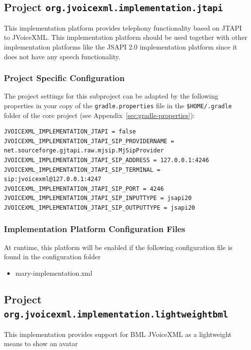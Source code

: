 \documentclass[11pt,a4paper]{article}
\begin{document}
\subsection{Project \texttt{org.jvoicexml.implementation.jtapi}}

This implementation platform provides telephony functionality based on JTAPI to
JVoiceXML. This implementation platform should be used together with other
implementation platforms like the JSAPI 2.0 implementation platform since it
does not have any speech functionality.

\subsubsection{Project Specific Configuration}

The project settings for this subproject can be adapted by the following
properties in your copy of the \texttt{gradle.properties} file in the
\texttt{\${HOME}/.gradle} folder of the core project (see 
Appendix~\ref{sec:gradle-properties}):
\begin{lstlisting}
JVOICEXML_IMPLEMENTATION_JTAPI = false
JVOICEXML_IMPLEMENTATION_JTAPI_SIP_PROVIDERNAME = net.sourceforge.gjtapi.raw.mjsip.MjSipProvider
JVOICEXML_IMPLEMENTATION_JTAPI_SIP_ADDRESS = 127.0.0.1:4246
JVOICEXML_IMPLEMENTATION_JTAPI_SIP_TERMINAL = sip:jvoicexml@127.0.0.1:4247
JVOICEXML_IMPLEMENTATION_JTAPI_SIP_PORT = 4246
JVOICEXML_IMPLEMENTATION_JTAPI_SIP_INPUTTYPE = jsapi20
JVOICEXML_IMPLEMENTATION_JTAPI_SIP_OUTPUTTYPE = jsapi20
\end{lstlisting}

\subsubsection{Implementation Platform Configuration Files}

At runtime, this platform will be enabled if the following configuration file is found in the configuration
folder
\begin{itemize}
\item mary-implementation.xml
\end{itemize}

\subsection{Project \texttt{org.jvoicexml.implementation.lightweightbml}}

This implementation provides support for BML JVoiceXML as a lightweight means to show an avatar
\end{document}
